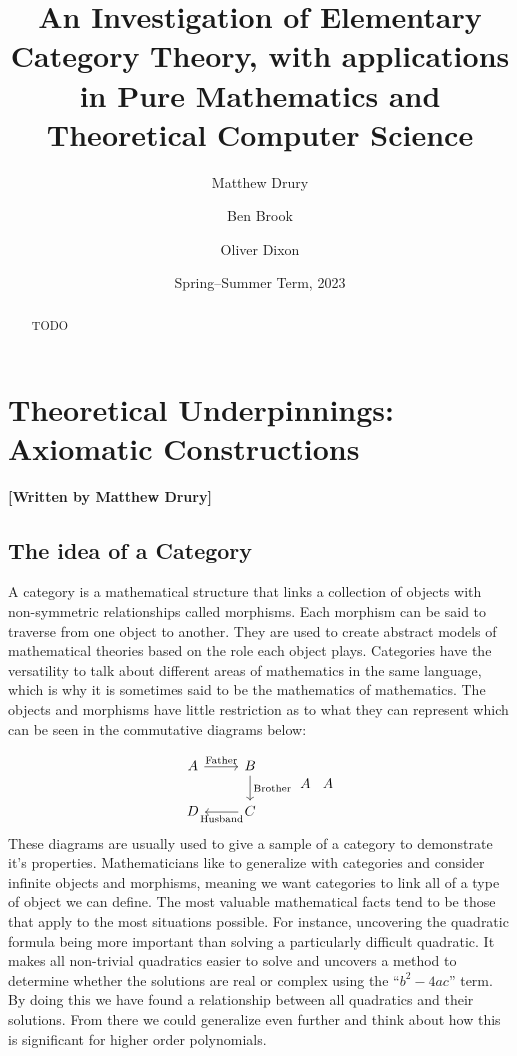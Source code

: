 \documentclass[10pt,a4paper,reqno]{amsart}
\title[An Investigation of Elementary Category Theory]{An Investigation of %
        Elementary Category Theory, with applications in Pure Mathematics and %
        Theoretical Computer Science}
\author{Matthew Drury} \email{\yorkemail{md1499}}
\author{Ben Brook}     \email{\yorkemail{bb1170}}
\author{Oliver Dixon}  \email{\yorkemail{od641}}
\date{Spring--Summer Term, 2023}
\numberwithin{figure}{section}
\begin{document}
\begin{abstract}
        TODO
\end{abstract}
\maketitle
\tableofcontents
\section{Theoretical %
        Underpinnings: Axiomatic Constructions}
\begin{flushright}
        \textbf{[Written by Matthew Drury]}
\end{flushright}

\subsection{The idea of a Category}
A category is a mathematical structure that links a collection of objects with
non-symmetric relationships called morphisms.  Each morphism can be said to
traverse from one object to another.  They are used to create abstract models of
mathematical theories based on the role each object plays.  Categories have the
versatility to talk about different areas of mathematics in the same language,
which is why it is sometimes said to be the mathematics of mathematics.   
The objects and morphisms have little restriction as to what they can represent
which can be seen in the commutative diagrams below:

\begin{equation}
        \begin{tikzcd}
                A \ar[r,"\text{Father}"] & B \ar[d,"\text{Brother}"] \\
                D & C \ar[l,"\text{Husband}"]
        \end{tikzcd}
        \begin{tikzcd}
        A
        \end{tikzcd}
        \begin{tikzcd}
        A
        \end{tikzcd}
\end{equation}
These diagrams are usually used to give a sample of a category to demonstrate
it's properties.  Mathematicians like to generalize with categories and consider
infinite objects and morphisms, meaning we want categories to link all of a type 
of object we can define.   The most valuable mathematical facts
tend to be those that apply to the most situations possible.  For instance,
uncovering the quadratic formula being more important than solving a
particularly difficult quadratic.  It makes all non-trivial quadratics easier to
solve and uncovers a method to determine whether the solutions are real or
complex using the ``$b^2-4ac$'' term.   By doing this we have found a relationship
between all quadratics and their solutions.   From there we could generalize even
further and think about how this is significant for higher order polynomials.
\end{document}
